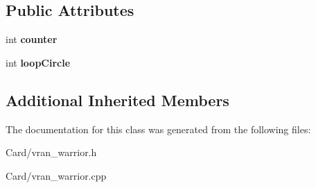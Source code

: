 \subsection*{Public Attributes}
\begin{DoxyCompactItemize}
\item 
\mbox{\label{class_vran___warrior_a734409b65fe00527b0d5a7084f861e3a}} 
int {\bfseries counter}
\item 
\mbox{\label{class_vran___warrior_ad7c69ca68342613afb1a01738052d692}} 
int {\bfseries loop\+Circle}
\end{DoxyCompactItemize}
\subsection*{Additional Inherited Members}


The documentation for this class was generated from the following files\+:\begin{DoxyCompactItemize}
\item 
Card/vran\+\_\+warrior.\+h\item 
Card/vran\+\_\+warrior.\+cpp\end{DoxyCompactItemize}
